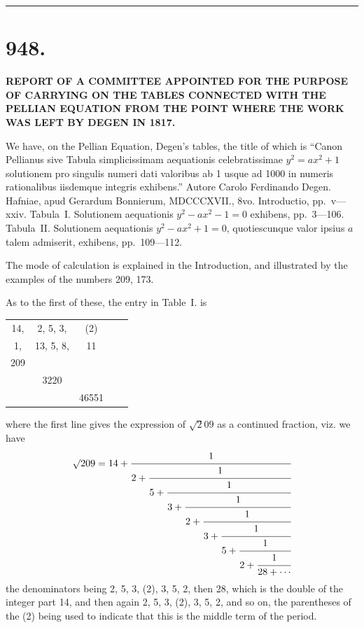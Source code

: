 \documentclass[11pt,a4paper]{book}
\begin{document}
{{{\vspace{1em}
\hrule
\vspace{1em}


\newpage
\section*{948.}

\begin{center}
{\large\bfseries REPORT OF A COMMITTEE APPOINTED FOR THE PURPOSE OF CARRYING ON THE TABLES CONNECTED WITH THE PELLIAN EQUATION FROM THE POINT WHERE THE WORK WAS LEFT BY DEGEN IN 1817.}
\end{center}

\begin{flushright}
\end{flushright}

We have, on the Pellian Equation, Degen's tables, the title of which is ``Canon Pellianus sive Tabula simplicissimam aequationis celebratissimae $y^{2} = ax^{2} + 1$ solutionem pro singulis numeri dati valoribus ab 1 usque ad 1000 in numeris rationalibus iisdemque integris exhibens.'' Autore Carolo Ferdinando Degen. Hafniae, apud Gerardum Bonnierum, MDCCCXVII., 8vo. Introductio, pp.~v---xxiv. Tabula~I. Solutionem aequationis $y^{2} - ax^{2} - 1 = 0$ exhibens, pp.~3---106. Tabula~II. Solutionem aequationis $y^{2} - ax^{2} + 1 = 0$, quotiescunque valor ipsius $a$ talem admiserit, exhibens, pp.~109---112.

The mode of calculation is explained in the Introduction, and illustrated by the examples of the numbers 209, 173.

As to the first of these, the entry in Table~I. is
\begin{center}
\begin{tabular}{ccccc}
14, & 2, 5, 3, & (2) & & \\
1, & 13, 5, 8, & 11 & & \\
209 & & & & \\
& 3220 & & & \\
& & 46551 & &
\end{tabular}
\end{center}
where the first line gives the expression of $\surd 209$ as a continued fraction, viz. we have
\[
\surd 209 = 14 +
\cfrac{1}{2+
 \cfrac{1}{5+
  \cfrac{1}{3+
   \cfrac{1}{2+
    \cfrac{1}{3+
     \cfrac{1}{5+
      \cfrac{1}{2+
       \cfrac{1}{28+\cdots}}}}}}}}
\]
the denominators being 2, 5, 3, (2), 3, 5, 2, then 28, which is the double of the integer part 14, and then again 2, 5, 3, (2), 3, 5, 2, and so on, the parentheses of the (2) being used to indicate that this is the middle term of the period.

}}}
\end{document}
